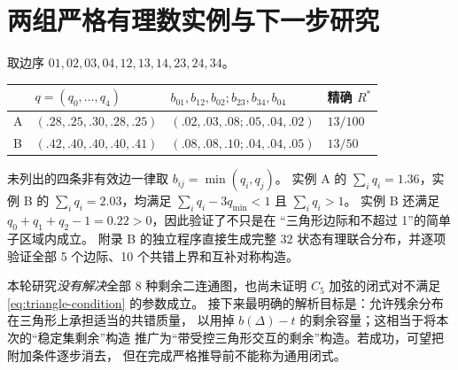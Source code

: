 \documentclass[11pt,a4paper]{ctexart}
\theoremstyle{remark}\newtheorem{remark}[theorem]{备注}
\begin{document}
\section{两组严格有理数实例与下一步研究}
取边序 $01,02,03,04,12,13,14,23,24,34$。
\begin{center}
\begin{tabular}{llll}
\toprule
 & $q=(q_0,\ldots,q_4)$ & $b_{01},b_{12},b_{02};b_{23},b_{34},b_{04}$ & 精确 $R^*$ \\
\midrule
A & $(.28,.25,.30,.28,.25)$ & $(.02,.03,.08;.05,.04,.02)$ & $13/100$ \\
B & $(.42,.40,.40,.40,.41)$ & $(.08,.08,.10;.04,.04,.05)$ & $13/50$ \\
\bottomrule
\end{tabular}
\end{center}
未列出的四条非有效边一律取 $b_{ij}=\min(q_i,q_j)$。
实例 A 的 $\sum_iq_i=1.36$，实例 B 的 $\sum_iq_i=2.03$，均满足
$\sum_iq_i-3q_{\min}<1$ 且 $\sum_iq_i>1$。
实例 B 还满足 $q_0+q_1+q_2-1=0.22>0$，因此验证了不只是在
“三角形边际和不超过 1”的简单子区域内成立。
附录 B 的独立程序直接生成完整 32 状态有理联合分布，并逐项验证全部
5 个边际、10 个共错上界和互补对称构造。

本轮研究\emph{没有解决}全部 8 种剩余二连通图，也尚未证明
$C_5$ 加弦的闭式对不满足 \eqref{eq:triangle-condition} 的参数成立。
接下来最明确的解析目标是：允许残余分布在三角形上承担适当的共错质量，
以用掉 $b(\Delta)-t$ 的剩余容量；这相当于将本次的“稳定集剩余”构造
推广为“带受控三角形交互的剩余”构造。若成功，可望把附加条件逐步消去，
但在完成严格推导前不能称为通用闭式。
\end{document}
